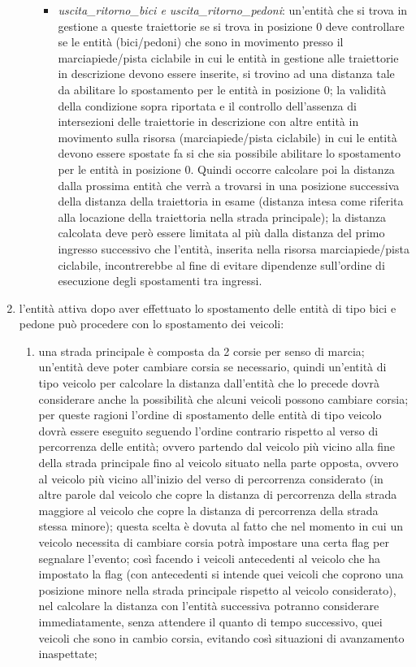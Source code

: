 \begin{enumerate}
\begin{enumerate}
\begin{itemize}
\item \textit{usci\-ta\_ri\-tor\-no\_bi\-ci e usci\-ta\_ri\-tor\-no\_pe\-do\-ni}: un'entità che si trova in gestione a queste traiettorie se si trova in posizione 0 deve controllare se le entità (bici/pedoni) che sono in movimento presso il marciapiede/pista ciclabile in cui le entità in gestione alle traiettorie in descrizione devono essere inserite, si trovino ad una distanza tale da abilitare lo spostamento per le entità in posizione 0; la validità della condizione sopra riportata e il controllo dell'assenza di intersezioni delle traiettorie in descrizione con altre entità in movimento sulla risorsa (marciapiede/pista ciclabile) in cui le entità devono essere spostate fa si che sia possibile abilitare lo spostamento per le entità in posizione 0. Quindi occorre calcolare poi la distanza dalla prossima entità che verrà a trovarsi in una posizione successiva della distanza della traiettoria in esame (distanza intesa come riferita alla locazione della traiettoria nella strada principale); la distanza calcolata deve però essere limitata al più dalla distanza del primo ingresso successivo che l'entità, inserita nella risorsa marciapiede/pista ciclabile, incontrerebbe al fine di evitare dipendenze sull'ordine di esecuzione degli spostamenti tra ingressi.
\end{itemize}
\end{enumerate}
\item l'entità attiva dopo aver effettuato lo spostamento delle entità di tipo bici e pedone può procedere con lo spostamento dei veicoli:
\begin{enumerate}
\item una strada principale è composta da 2 corsie per senso di marcia; un'entità deve poter cambiare corsia se necessario, quindi un'entità di tipo veicolo per calcolare la distanza dall'entità che lo precede dovrà considerare anche la possibilità che alcuni veicoli possono cambiare corsia; per queste ragioni l'ordine di spostamento delle entità di tipo veicolo dovrà essere eseguito seguendo l'ordine contrario rispetto al verso di percorrenza delle entità; ovvero partendo dal veicolo più vicino alla fine della strada principale fino al veicolo situato nella parte opposta, ovvero al veicolo più vicino all'inizio del verso di percorrenza considerato (in altre parole dal veicolo che copre la distanza di percorrenza della strada maggiore al veicolo che copre la distanza di percorrenza della strada stessa minore); questa scelta è dovuta al fatto che nel momento in cui un veicolo necessita di cambiare corsia potrà impostare una certa flag per segnalare l'evento; così facendo i veicoli antecedenti al veicolo che ha impostato la flag (con antecedenti si intende quei veicoli che coprono una posizione minore nella strada principale rispetto al veicolo considerato), nel calcolare la distanza con l'entità successiva potranno considerare immediatamente, senza attendere il quanto di tempo successivo, quei veicoli che sono in cambio corsia, evitando così situazioni di avanzamento inaspettate;

\end{enumerate}
\end{enumerate}
